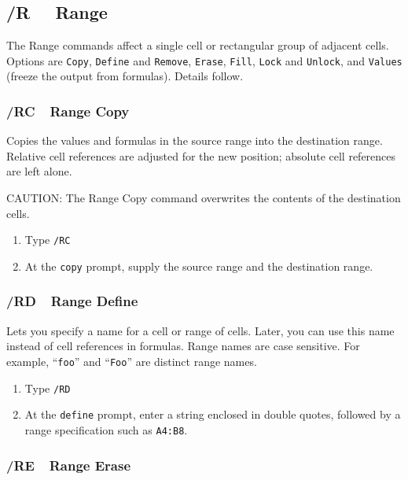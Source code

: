 \documentclass[titlepage]{article}
\begin{document}
\subsection[Range Commands]{/R \ \      Range}
\label{subsec:range}
        
The Range commands affect a single cell or rectangular group of
adjacent cells.  Options are \texttt{Copy}, \texttt{Define} and
\texttt{Remove}, \texttt{Erase}, \texttt{Fill}, \texttt{Lock} and
\texttt{Unlock}, and \texttt{Values} (freeze the output from
formulas).  Details follow.
        
\subsubsection{/RC\ \      Range Copy}

Copies the values and formulas in the source range into the
destination range.  Relative cell references are adjusted for the new
position; absolute cell references are left alone.

CAUTION: The Range Copy command overwrites the contents of the
destination cells.

\usage{}
\begin{enumerate}\itemsep -2pt
\item Type \texttt{/RC}
\item At the \texttt{copy} prompt, supply the source range and the
  destination range.
\end{enumerate}
        
\subsubsection{/RD\ \      Range Define}

Lets you specify a name for a cell or range of cells.  Later, you
can use this name instead of cell references in formulas.  Range names
are case sensitive.  For example, ``\texttt{foo}'' and
``\texttt{Foo}'' are distinct range names.

\usage{}
\begin{enumerate}\itemsep -2pt
\item Type \texttt{/RD}
\item At the \texttt{define} prompt, enter a string enclosed in double
  quotes, followed by a range specification such as \texttt{A4:B8}.
\end{enumerate}
        
\subsubsection{/RE\ \      Range Erase}
\end{document}
